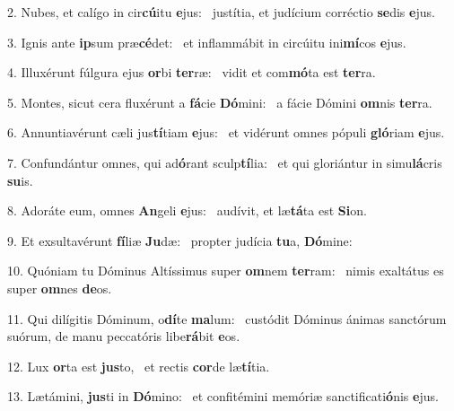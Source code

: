 2. Nubes, et calígo in cir\textbf{cú}itu \textbf{e}jus: \ast\  justítia, et judícium corréctio \textbf{se}dis \textbf{e}jus.\

3. Ignis ante \textbf{ip}sum præ\textbf{cé}det: \ast\  et inflammábit in circúitu ini\textbf{mí}cos \textbf{e}jus.\

4. Illuxérunt fúlgura ejus \textbf{or}bi \textbf{ter}ræ: \ast\  vidit et com\textbf{mó}ta est \textbf{ter}ra.\

5. Montes, sicut cera fluxérunt a \textbf{fá}cie \textbf{Dó}mini: \ast\  a fácie Dómini \textbf{om}nis \textbf{ter}ra.\

6. Annuntiavérunt cæli jus\textbf{tí}tiam \textbf{e}jus: \ast\  et vidérunt omnes pópuli \textbf{gló}riam \textbf{e}jus.\

7. Confundántur omnes, qui ad\textbf{ó}rant sculp\textbf{tí}lia: \ast\  et qui gloriántur in simu\textbf{lá}cris \textbf{su}is.\

8. Adoráte eum, omnes \textbf{An}geli \textbf{e}jus: \ast\  audívit, et læ\textbf{tá}ta est \textbf{Si}on.\

9. Et exsultavérunt \textbf{fí}liæ \textbf{Ju}dæ: \ast\  propter judícia \textbf{tu}a, \textbf{Dó}mine:\

10. Quóniam tu Dóminus Altíssimus super \textbf{om}nem \textbf{ter}ram: \ast\  nimis exaltátus es super \textbf{om}nes \textbf{de}os.\

11. Qui dilígitis Dóminum, o\textbf{dí}te \textbf{ma}lum: \ast\  custódit Dóminus ánimas sanctórum suórum, de manu peccatóris libe\textbf{rá}bit \textbf{e}os.\

12. Lux \textbf{or}ta est \textbf{jus}to, \ast\  et rectis \textbf{cor}de læ\textbf{tí}tia.\

13. Lætámini, \textbf{jus}ti in \textbf{Dó}mino: \ast\  et confitémini memóriæ sanctificati\textbf{ó}nis \textbf{e}jus.\

